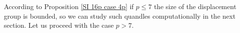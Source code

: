 \documentclass[a4paper, english, 9pt]{amsart}
\theoremstyle{plain}
\newtheorem{proposition}[theorem]{Proposition}
\theoremstyle{definition}
\def\dis{\mathrm{Dis}}
\def\con{\mathrm{Con}}
\def\comment#1{{\color{red} #1}}
\def\Z{\mathbb Z}
\begin{document}
According to Proposition \ref{SI 16p case 4p} if $p\leq 7$ the size of the displacement group is bounded, so we can study such quandles computationally in the next section. Let us proceed with the case $p>7$.%









\end{document}
